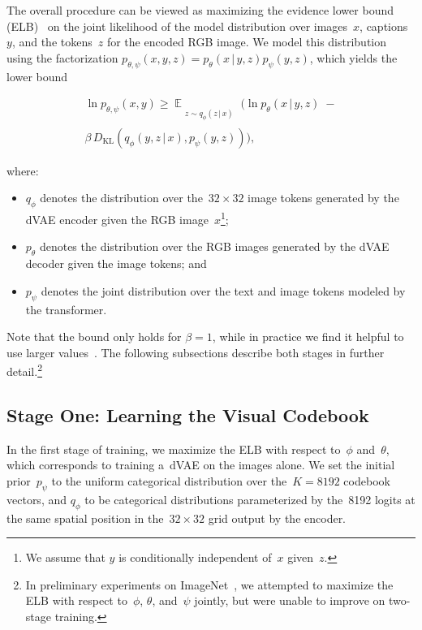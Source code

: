 The overall procedure can be viewed as maximizing the evidence lower bound (ELB)~\cite{kingma2013auto,rezende2014stochastic} on the joint likelihood of the model distribution over images~$x$, captions~$y$, and the tokens~$z$ for the encoded RGB image. We model this distribution using the factorization $p_{\theta, \psi}(x, y, z) = p_\theta(x \,|\, y, z) p_\psi(y, z)$, which yields the lower bound

\begin{multline}
    \ln p_{\theta, \psi}(x, y) \geqslant \!\!\!\!\!\!\!\! \mathop{\mathbb{E}}_{\substack{ \\ z \sim q_\phi(z \,|\, x)}} \!\!\!\!\!\!\!\! \big( \ln p_\theta(x \,|\, y, z)
    \;- \\ 
    \beta\, D_{\mathrm{KL}}(q_\phi(y, z \,|\, x), p_\psi(y,z)) \big), \label{eq:elb}
\end{multline}

where:

\begin{itemize}
    \item $q_\phi$ denotes the distribution over the~$32 \times 32$ image tokens generated by the dVAE encoder given the RGB image~$x$\footnote{We assume that $y$ is conditionally independent of~$x$ given~$z$.};
    \item $p_\theta$ denotes the distribution over the RGB images generated by the dVAE decoder given the image tokens; and \item $p_\psi$ denotes the joint distribution over the text and image tokens modeled by the transformer.
\end{itemize}

Note that the bound only holds for $\beta=1$, while in practice we find it helpful to use larger values~\cite{higgins2016beta}. The following subsections describe both stages in further detail.\footnote{In preliminary experiments on ImageNet~\cite{deng2009imagenet}, we attempted to maximize the ELB with respect to~$\phi$, $\theta$, and~$\psi$ jointly, but were unable to improve on two-stage training.}

\subsection{Stage One: Learning the Visual Codebook}

In the first stage of training, we maximize the ELB with respect to~$\phi$ and~$\theta$, which corresponds to training a~dVAE on the images alone. We set the initial prior~$p_\psi$ to the uniform categorical distribution over the~$K = \num{8192}$ codebook vectors, and $q_\phi$ to be categorical distributions parameterized by the~\num{8192} logits at the same spatial position in the~$32 \times 32$ grid output by the encoder.

